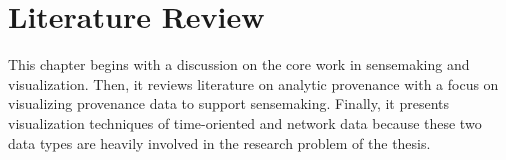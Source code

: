 \chapter{Literature Review}
\label{chap:review}

\graphicspath{{Chapter2/figures/}}

This chapter begins with a discussion on the core work in sensemaking and visualization. Then, it reviews literature on analytic provenance with a focus on visualizing provenance data to support sensemaking. Finally, it presents visualization techniques of time-oriented and network data because these two data types are heavily involved in the research problem of the thesis.

 



